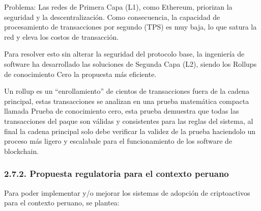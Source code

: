 \documentclass[12pt,a4paper]{article}
\begin{document}
\begin{enumerate}[label=\alph*.]
Problema: Las redes de Primera Capa (L1), como Ethereum, priorizan la seguridad y la descentralización. Como consecuencia, la capacidad de procesamiento de transacciones por segundo (TPS) es muy baja, lo que satura la red y eleva los costos de transacción.

Para resolver esto sin alterar la seguridad del protocolo base, la ingeniería de software ha desarrollado las soluciones de Segunda Capa (L2), siendo los Rollups de conocimiento Cero la propuesta más eficiente.

Un rollup es un ``enrollamiento'' de cientos de transacciones fuera de la cadena principal, estas transacciones se analizan en una prueba matemática compacta llamada Prueba de conocimiento cero, esta prueba demuestra que todas las transacciones del paque son válidas y consistentes para las reglas del sistema, al final la cadena principal solo debe verificar la validez de la prueba haciendolo un proceso más ligero y escalabale para el funcionamiento de los software de blockchain.
\end{enumerate}

\subsubsection*{2.7.2. Propuesta regulatoria para el contexto peruano}

Para poder implementar y/o mejorar los sistemas de adopción de criptoactivos para el contexto peruano, se plantea:
\end{document}
